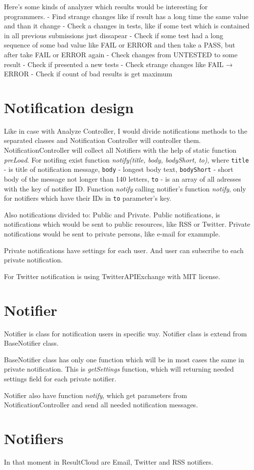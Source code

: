 \documentclass[a4paper,11pt]{article}
\begin{document}
Here's some kinds of analyzer which results would be interesting for programmers.
- Find strange changes like if result has a long time the same value and than it change
- Check a changes in tests, like if some test which is contained in all previous submissions just dissapear
- Check if some test had a long sequence of some bad value like FAIL or ERROR and then take a PASS, but after take FAIL or ERROR again
- Check changes from UNTESTED to some result
- Check if presented a new tests
- Check strange changes like FAIL → ERROR
- Check if count of bad results is get maximum

\section{Notification design}

Like in case with Analyze Controller, I would divide notifications methods to the separated classes and Notification Controller will controller them. NotificationController will collect all Notifiers with the help of static function \emph{preLoad}. For notifing exist function \emph{notify(title, body, bodyShort, to)}, where \texttt{title} - is title of notification message, \texttt{body} - longest body text, \texttt{bodyShort} - short body of the message not longer than 140 letters, \texttt{to} - is an array of all adresses with the key of notifier ID. Function \emph{notify} calling notifier's function \emph{notify}, only for notifiers which have their IDs in \texttt{to} parameter's key.

Also notifications divided to: Public and Private. Public notifications, is notifications which would be sent to public resources, like RSS or Twitter. Private notifications would be sent to private persons, like e-mail for exammple.

Private notifications have settings for each user. And user can subscribe to each private notification.

For Twitter notification is using TwitterAPIExchange with MIT license.

\section{Notifier}

Notifier is class for notification users in specific way. Notifier class is extend from BaseNotifier class.

BaseNotifier class has only one function which will be in most cases the same in private notification. This is \emph{getSettings} function, which will returning needed settings field for each private notifier. 

Notifier also have function \emph{notify}, which get parameters from NotificationController and send all needed notification messages.

\section{Notifiers}

In that moment in ResultCloud are Email, Twitter and RSS notifiers.
\end{document}
